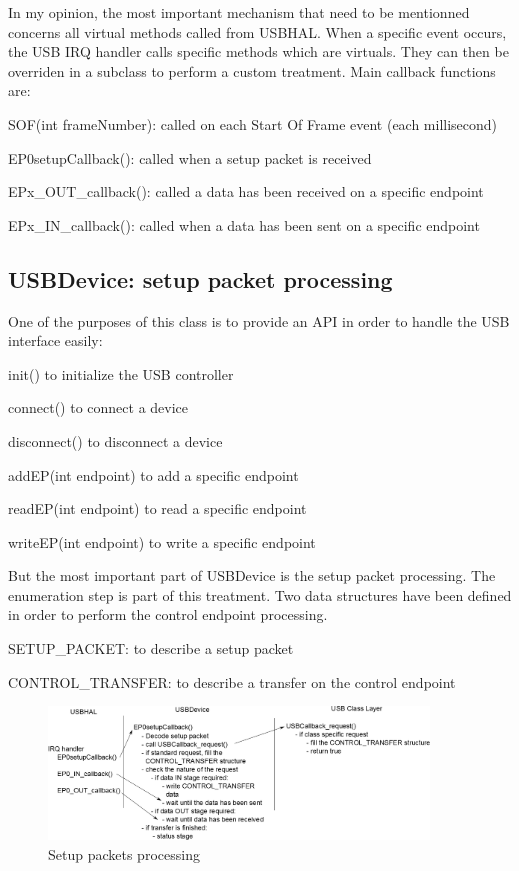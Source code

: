 \documentclass[pdftex,10pt,a4paper]{report}
\newenvironment{packed_item}{
\begin{itemize}
  \setlength{\itemsep}{1pt}
  \setlength{\parskip}{0pt}
  \setlength{\parsep}{0pt}
}{\end{itemize}}
\begin{document}
In my opinion, the most important mechanism that need to be mentionned concerns all virtual methods called from USBHAL. When a specific event occurs, the USB IRQ handler calls specific methods which are virtuals. They can then be overriden in a subclass to perform a custom treatment. Main callback functions are:
\begin{packed_item}
	\item SOF(int frameNumber): called on each Start Of Frame event (each millisecond)
	\item EP0setupCallback(): called when a setup packet is received
	\item EPx\_OUT\_callback(): called a data has been received on a specific endpoint
	\item EPx\_IN\_callback(): called when a data has been sent on a specific endpoint
\end{packed_item}


\subsection{USBDevice: setup packet processing}
One of the purposes of this class is to provide an API in order to handle the USB interface easily:
\begin{packed_item}
	\item init() to initialize the USB controller
	\item connect() to connect a device
	\item disconnect() to disconnect a device
	\item addEP(int endpoint) to add a specific endpoint
	\item readEP(int endpoint) to read a specific endpoint
	\item writeEP(int endpoint) to write a specific endpoint 
\end{packed_item}

But the most important part of USBDevice is the setup packet processing. The enumeration step is part of this treatment.
Two data structures have been defined in order to perform the control endpoint processing.
\begin{packed_item}
	\item SETUP\_PACKET: to describe a setup packet
	\item CONTROL\_TRANSFER: to describe a transfer on the control endpoint
\end{packed_item}

\begin{figure}[h!]
		\centering
		\includegraphics[width=0.9\textwidth]{./setup_packets.jpg}
		\caption{Setup packets processing}
		\label{Setup packets processing}
\end{figure}
\end{document}

